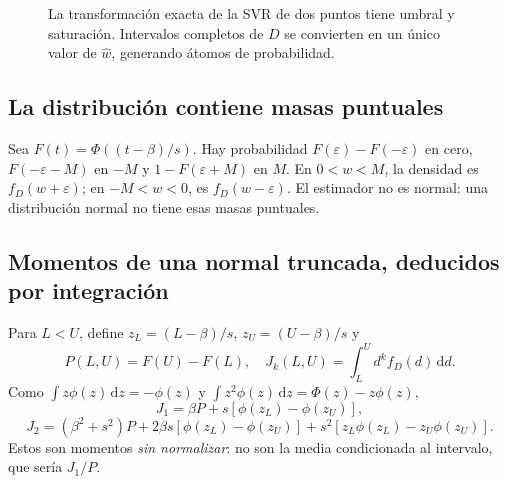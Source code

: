 \documentclass[11pt,a4paper]{article}
\newcommand{\dd}{\,\mathrm d}
\theoremstyle{definition}
\begin{document}
\begin{figure}[H]\centering
{}
\caption{La transformación exacta de la SVR de dos puntos tiene umbral y saturación. Intervalos completos de $D$ se convierten en un único valor de $\widehat w$, generando átomos de probabilidad.}
\end{figure}

\subsection{La distribución contiene masas puntuales}
Sea $F(t)=\Phi((t-\beta)/s)$. Hay probabilidad $F(\varepsilon)-F(-\varepsilon)$ en cero, $F(-\varepsilon-M)$ en $-M$ y $1-F(\varepsilon+M)$ en $M$. En $0<w<M$, la densidad es $f_D(w+\varepsilon)$; en $-M<w<0$, es $f_D(w-\varepsilon)$. El estimador no es normal: una distribución normal no tiene esas masas puntuales.
\subsection{Momentos de una normal truncada, deducidos por integración}
Para $L<U$, define $z_L=(L-\beta)/s$, $z_U=(U-\beta)/s$ y
\[
P(L,U)=F(U)-F(L),\quad J_k(L,U)=\int_L^U d^k f_D(d)\dd d.
\]
Como $\int z\phi(z)\dd z=-\phi(z)$ y $\int z^2\phi(z)\dd z=\Phi(z)-z\phi(z)$,
\[
J_1=\beta P+s[\phi(z_L)-\phi(z_U)],
\]
\[
J_2=(\beta^2+s^2)P+2\beta s[\phi(z_L)-\phi(z_U)]
+s^2[z_L\phi(z_L)-z_U\phi(z_U)].
\]
Estos son momentos \emph{sin normalizar}: no son la media condicionada al intervalo, que sería $J_1/P$.
\end{document}
